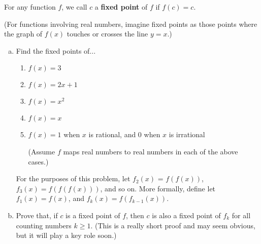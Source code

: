 \begin{problem}
\label{pr:fp-intro}
For any function $f$, we call $c$ a \textbf{fixed point} of $f$ if $f(c) = c$. 

(For functions involving real numbers, imagine fixed points as those points where the graph of $f(x)$ touches or crosses the line $y = x$.)


\begin{enumerate}[(a)]
\item Find the fixed points of... 
\begin{enumerate}[i]
\item $f(x) = 3$
\item $f(x) = 2x + 1$
\item $f(x) = x^2$
\item $f(x) = x$
\item $f(x) = 1$ when $x$ is rational, and 0 when $x$ is irrational

(Assume $f$ maps real numbers to real numbers in each of the above cases.)
\end{enumerate}

For the purposes of this problem, let $f_2(x)$ = $f(f(x))$, $f_3(x) = f(f(f(x)))$, and so on. More formally, define let $f_1(x) = f(x)$, and $f_k(x) = f(f_{k-1}(x))$.

\item Prove that, if $c$ is a fixed point of $f$, then $c$ is also a fixed point of $f_k$ for all counting numbers $k \geq 1$. (This is a really short proof and may seem obvious, but it will play a key role soon.)
\end{enumerate}
\end{problem}

